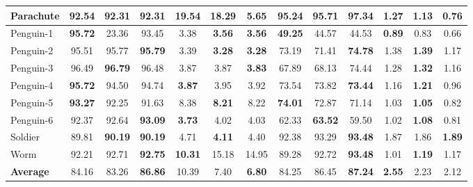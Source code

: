 \documentclass[runningheads]{llncs}
\begin{document}
\begin{table}
\begin{center}
\begin{adjustbox}{max width=\textwidth}
\begin{tabular}{|l|c|c|c||c|c|c||c|c|c||c|c|c|}
Parachute          & 92.54          & 92.31          & \textbf{92.31} & 19.54          & 18.29          & \textbf{5.65}  & 95.24          & 95.71          & \textbf{97.34} & \textbf{1.27}  & 1.13          & 0.76          \\ \hline
Penguin-1          & \textbf{95.72} & 23.36          & 93.45          & 3.38           & \textbf{3.56}  & \textbf{3.56}  & \textbf{49.25} & 44.57          & 44.53          & \textbf{0.89}  & 0.83          & 0.66          \\ \hline
Penguin-2          & 95.51          & 95.77          & \textbf{95.79} & 3.39           & \textbf{3.28}  & \textbf{3.28}  & 73.19          & 71.41          & \textbf{74.78} & 1.38           & \textbf{1.39} & 1.17          \\ \hline
Penguin-3          & 96.49          & \textbf{96.79} & 96.48          & 3.87           & 3.87           & \textbf{3.83}  & 67.89          & 68.13          & 74.44          & 1.28           & \textbf{1.32} & 1.16          \\ \hline
Penguin-4          & \textbf{95.72} & 94.50          & 94.74          & \textbf{3.87}  & 3.95           & 3.92           & 73.54          & 73.82          & \textbf{73.44} & 1.16           & \textbf{1.21} & 0.96          \\ \hline
Penguin-5          & \textbf{93.27} & 92.25          & 91.63          & 8.38           & \textbf{8.21}  & 8.22           & \textbf{74.01} & 72.87          & 71.14          & 1.03           & \textbf{1.05} & 0.82          \\ \hline
Penguin-6          & 92.37          & 92.64          & \textbf{93.09} & \textbf{3.73}  & 4.02           & 4.03           & 62.33          & \textbf{63.52} & 59.50          & 1.02           & \textbf{1.08} & 0.81          \\ \hline
Soldier            & 89.81          & \textbf{90.19} & \textbf{90.19} & 4.71           & \textbf{4.11}  & 4.40           & 92.38          & 93.29          & \textbf{93.48} & 1.87           & 1.86          & \textbf{1.89} \\ \hline
Worm               & 92.21          & 92.71          & \textbf{92.75} & \textbf{10.31} & 15.18          & 14.95          & 89.28          & 92.72          & \textbf{93.48} & 1.01           & \textbf{1.19} & 1.17          \\ \hline
\textbf{Average}   & 84.16          & 83.26          & \textbf{86.86} & 10.39          & 7.40           & \textbf{6.80}  & 84.25          & 86.45          & \textbf{87.24} & \textbf{2.55}  & 2.23          & 2.12          \\ \hline
\end{tabular}
\end{adjustbox}
\end{center}
\label{cptb1}
\end{table}
\end{document}
